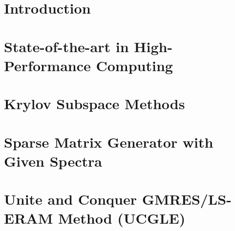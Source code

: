 \documentclass{xinzhewu}
\begin{document}
\clearemptydoublepage


\clearemptydoublepage

\frontmatter

{\tableofcontents}

{
\listoffigures
{}
}

{
\listoftables
{}
}

{
\listofalgorithms
{}
}

\mbox{}


\printnomenclature[1.5in]



\mainmatter %

\chapter{Introduction}



\chapter{State-of-the-art in High-Performance Computing} \label{State-of-the-art in High-Performance Computing}



\chapter{Krylov Subspace Methods}\label{Krylov Subspace Methods}



\chapter{Sparse Matrix Generator with Given Spectra}\label{Sparse Matrix Generator with Given Spectra}



\chapter[Unite and Conquer GMRES/LS-ERAM Method (UCGLE)]{Unite and Conquer GMRES/LS-ERAM Method (UCGLE)}\label{Unite and Conquer GMRES/LS-ERAM Method}
\end{document}
